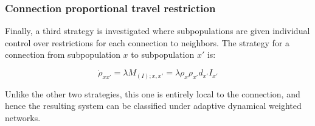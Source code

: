 \subsubsection{Connection proportional travel restriction}

Finally, a third strategy is investigated where subpopulations are given individual control over restrictions for each connection to neighbors. The strategy for a connection from subpopulation $x$ to subpopulation $x'$ is:

\begin{equation}
\dot{\rho}_{xx'} = \lambda M_{(I);x,x'} = \lambda \rho_x \rho_{x'} d_{x'} I_{x'}
\end{equation}

Unlike the other two strategies, this one is entirely local to the connection, and hence the resulting system can be classified under adaptive dynamical weighted networks\cite{berner2023adaptive}.\\

